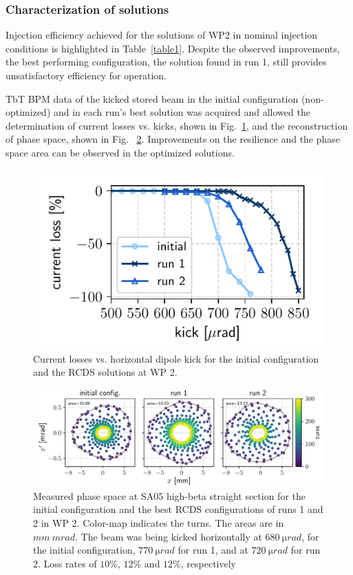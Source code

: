 \subsubsection{Characterization of solutions}
Injection efficiency  achieved for the solutions of WP2 in nominal injection conditions is highlighted in Table~\ref{table1}. Despite the observed improvements, the best performing configuration, the solution found in run 1, still provides unsatisfactory efficiency for operation.

TbT BPM data of the kicked stored beam  in the initial configuration (non-optimized) and in each run's best solution was acquired and allowed the determination of current losses vs. kicks, shown in Fig.~\ref{fig:loss_kicks_newtunes}, and the reconstruction of phase space, shown in Fig. ~\ref{fig:newtunes_phase}. Improvements on the resilience and the phase space area can be observed in the optimized solutions.
\begin{figure}[tb]
    \centering
    \includegraphics[width=0.6\columnwidth]{Images/WEPL087_f3.pdf}
    \caption[Current losses vs. horizontal dipole kick for the initial configuration and the RCDS solutions at WP 2.]{Current losses vs. horizontal dipole kick for the initial configuration and the RCDS solutions at WP 2.}
    \label{fig:loss_kicks_newtunes}
\end{figure}
\begin{figure}[htb]
    \includegraphics[width=\textwidth]{Images/WEPL087_f4.pdf}
    \caption[Measured phase space at SA05 high-beta straight section for the initial configuration and the best RCDS configurations of runs 1 and 2 in WP 2.]{Measured phase space at SA05 high-beta straight section for the initial configuration and the best RCDS configurations of runs 1 and 2 in WP 2. Color-map indicates the turns. The areas are in $\unit{mm}~\unit{mrad}$. The beam was being kicked horizontally at $680~\unit{\micro rad}$, for the initial configuration, $770~\unit{\micro rad}$ for run 1, and at $720~\unit{\micro rad}$ for run 2. Loss rates of $10\%$, $12\%$ and $12\%$, respectively}
    \label{fig:newtunes_phase}
\end{figure}


